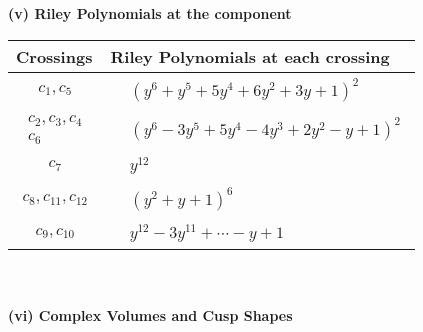 \documentclass[1p]{elsarticle_modified}
\theoremstyle{definition}
\begin{document}
\newpage\renewcommand{\arraystretch}{1}
\flushleft \textbf{(v) Riley Polynomials at the component}\newline \\
\begin{tabular}{m{50pt}|m{274pt}}
Crossings & \hspace{64pt}Riley Polynomials at each crossing \\
\hline $$\begin{aligned}c_{1},c_{5}\end{aligned}$$&$\begin{aligned}
&(y^6+y^5+5 y^4+6 y^2+3 y+1)^2
\end{aligned}$\\
\hline $$\begin{aligned}c_{2},c_{3},c_{4}\\c_{6}\end{aligned}$$&$\begin{aligned}
&(y^6-3 y^5+5 y^4-4 y^3+2 y^2- y+1)^2
\end{aligned}$\\
\hline $$\begin{aligned}c_{7}\end{aligned}$$&$\begin{aligned}
&y^{12}
\end{aligned}$\\
\hline $$\begin{aligned}c_{8},c_{11},c_{12}\end{aligned}$$&$\begin{aligned}
&(y^2+y+1)^6
\end{aligned}$\\
\hline $$\begin{aligned}c_{9},c_{10}\end{aligned}$$&$\begin{aligned}
&y^{12}-3 y^{11}+\cdots- y+1
\end{aligned}$\\
\hline
\end{tabular}\\~\\
\newpage\flushleft \textbf{(vi) Complex Volumes and Cusp Shapes}
\end{document}
